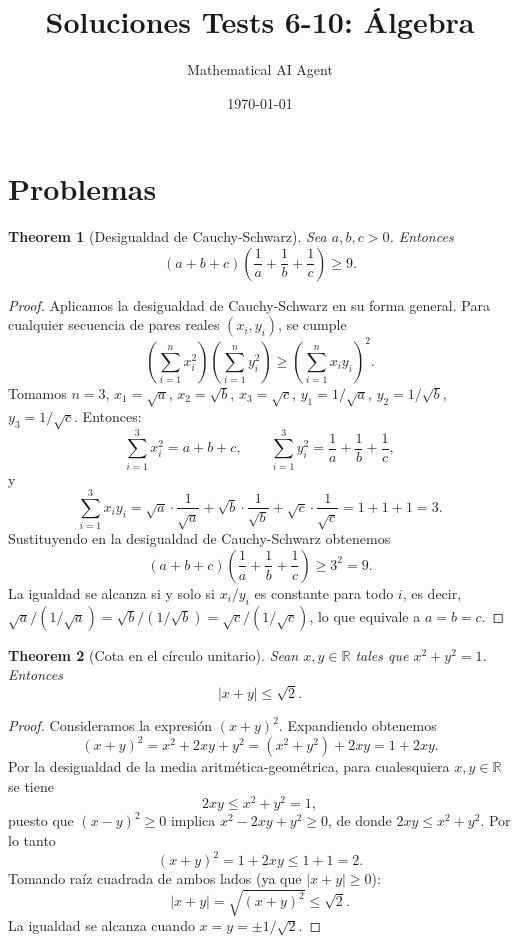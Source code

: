 \documentclass[11pt,a4paper]{article}
\title{Soluciones Tests 6-10: Álgebra}
\author{Mathematical AI Agent}
\date{\today}
\theoremstyle{plain}
\newtheorem{theorem}{Theorem}[section]
\theoremstyle{definition}
\begin{document}
\maketitle

\section{Problemas}

\begin{theorem}[Desigualdad de Cauchy-Schwarz]
Sea $a, b, c > 0$. Entonces
\[
(a + b + c)\left(\frac{1}{a} + \frac{1}{b} + \frac{1}{c}\right) \geq 9.
\]
\end{theorem}

\begin{proof}
Aplicamos la desigualdad de Cauchy-Schwarz en su forma general. Para cualquier secuencia de pares reales $(x_i, y_i)$, se cumple
\[
\left(\sum_{i=1}^{n} x_i^2\right)\left(\sum_{i=1}^{n} y_i^2\right) \geq \left(\sum_{i=1}^{n} x_i y_i\right)^2.
\]
Tomamos $n = 3$, $x_1 = \sqrt{a}$, $x_2 = \sqrt{b}$, $x_3 = \sqrt{c}$, $y_1 = 1/\sqrt{a}$, $y_2 = 1/\sqrt{b}$, $y_3 = 1/\sqrt{c}$. Entonces:
\[
\sum_{i=1}^{3} x_i^2 = a + b + c, \qquad \sum_{i=1}^{3} y_i^2 = \frac{1}{a} + \frac{1}{b} + \frac{1}{c},
\]
y
\[
\sum_{i=1}^{3} x_i y_i = \sqrt{a}\cdot\frac{1}{\sqrt{a}} + \sqrt{b}\cdot\frac{1}{\sqrt{b}} + \sqrt{c}\cdot\frac{1}{\sqrt{c}} = 1 + 1 + 1 = 3.
\]
Sustituyendo en la desigualdad de Cauchy-Schwarz obtenemos
\[
(a + b + c)\left(\frac{1}{a} + \frac{1}{b} + \frac{1}{c}\right) \geq 3^2 = 9.
\]
La igualdad se alcanza si y solo si $x_i/y_i$ es constante para todo $i$, es decir, $\sqrt{a}/(1/\sqrt{a}) = \sqrt{b}/(1/\sqrt{b}) = \sqrt{c}/(1/\sqrt{c})$, lo que equivale a $a = b = c$.
\end{proof}

\begin{theorem}[Cota en el círculo unitario]
Sean $x, y \in \mathbb{R}$ tales que $x^2 + y^2 = 1$. Entonces
\[
|x + y| \leq \sqrt{2}.
\]
\end{theorem}

\begin{proof}
Consideramos la expresión $(x + y)^2$. Expandiendo obtenemos
\[
(x + y)^2 = x^2 + 2xy + y^2 = (x^2 + y^2) + 2xy = 1 + 2xy.
\]
Por la desigualdad de la media aritmética-geométrica, para cualesquiera $x, y \in \mathbb{R}$ se tiene
\[
2xy \leq x^2 + y^2 = 1,
\]
puesto que $(x - y)^2 \geq 0$ implica $x^2 - 2xy + y^2 \geq 0$, de donde $2xy \leq x^2 + y^2$. Por lo tanto
\[
(x + y)^2 = 1 + 2xy \leq 1 + 1 = 2.
\]
Tomando raíz cuadrada de ambos lados (ya que $|x+y| \geq 0$):
\[
|x + y| = \sqrt{(x + y)^2} \leq \sqrt{2}.
\]
La igualdad se alcanza cuando $x = y = \pm 1/\sqrt{2}$.
\end{proof}
\end{document}
